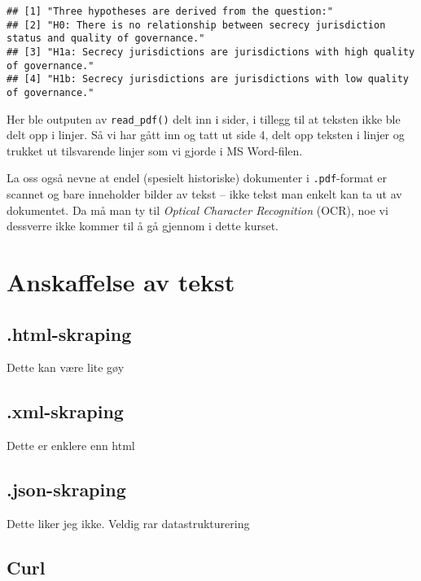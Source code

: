\documentclass[
]{article}
\begin{document}
\begin{verbatim}
## [1] "Three hypotheses are derived from the question:"                                            
## [2] "H0: There is no relationship between secrecy jurisdiction status and quality of governance."
## [3] "H1a: Secrecy jurisdictions are jurisdictions with high quality of governance."              
## [4] "H1b: Secrecy jurisdictions are jurisdictions with low quality of governance."
\end{verbatim}

Her ble outputen av \texttt{read\_pdf()} delt inn i sider, i tillegg til
at teksten ikke ble delt opp i linjer. Så vi har gått inn og tatt ut
side 4, delt opp teksten i linjer og trukket ut tilsvarende linjer som
vi gjorde i MS Word-filen.

La oss også nevne at endel (spesielt historiske) dokumenter i
\texttt{.pdf}-format er scannet og bare inneholder bilder av tekst --
ikke tekst man enkelt kan ta ut av dokumentet. Da må man ty til
\emph{Optical Character Recognition} (OCR), noe vi dessverre ikke kommer
til å gå gjennom i dette kurset.

\hypertarget{anskaff}{%
\section{Anskaffelse av tekst}\label{anskaff}}

\hypertarget{html-skraping}{%
\subsection{.html-skraping}\label{html-skraping}}

Dette kan være lite gøy

\hypertarget{xml-skraping}{%
\subsection{.xml-skraping}\label{xml-skraping}}

Dette er enklere enn html

\hypertarget{json-skraping}{%
\subsection{.json-skraping}\label{json-skraping}}

Dette liker jeg ikke. Veldig rar datastrukturering

\hypertarget{curl}{%
\subsection{Curl}\label{curl}}
\end{document}
